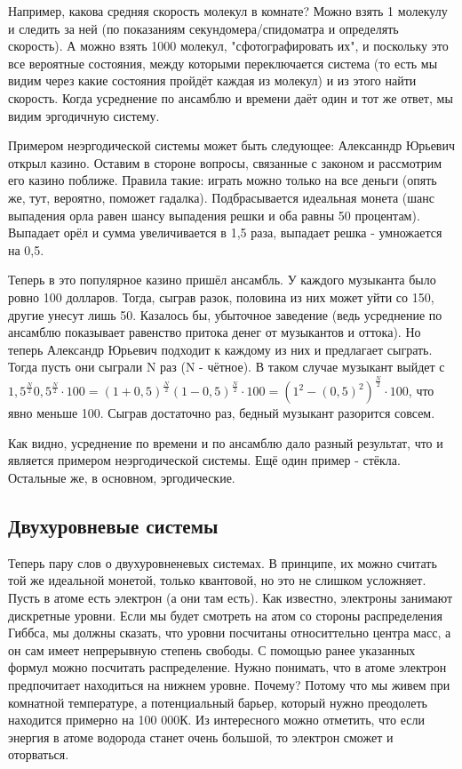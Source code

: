 \documentclass[a4paper, 12pt]{article}
\begin{document}
	Например, какова средняя скорость молекул в комнате? Можно взять 1 молекулу и следить за ней (по показаниям секундомера/спидоматра и определять скорость). А можно взять 1000 молекул, "сфотографировать их", и поскольку это все вероятные состояния, между которыми переключается система (то есть мы видим через какие состояния пройдёт каждая из молекул) и из этого найти скорость. Когда усреднение по ансамблю и времени даёт один и тот же ответ, мы видим эргодичную систему. 
	
	Примером неэргодической системы может быть следующее:
	Алексанндр Юрьевич открыл казино. Оставим в стороне вопросы, связанные с законом и рассмотрим его казино поближе. Правила такие: играть можно только на все деньги (опять же, тут, вероятно, поможет гадалка). Подбрасывается идеальная монета (шанс выпадения орла равен шансу выпадения решки и оба равны 50 процентам). Выпадает орёл и сумма увеличивается в 1,5 раза, выпадает решка - умножается на 0,5.
	
	Теперь в это популярное казино пришёл ансамбль. У каждого музыканта было ровно 100 долларов. Тогда, сыграв разок, половина из них может уйти со 150, другие унесут лишь 50. Казалось бы, убыточное заведение (ведь усреднение по ансамблю показывает равенство притока денег от музыкантов и оттока). Но теперь Александр Юрьевич подходит к каждому из них и предлагает сыграть. Тогда пусть они сыграли N раз (N - чётное). В таком случае музыкант выйдет с $1,5^{\frac{N}{2}} 0,5^{\frac{N}{2}} \cdot 100 = (1+0,5)^{\frac{N}{2}} (1-0,5)^{\frac{N}{2}} \cdot 100= (1^{2}-(0,5)^{2})^{\frac{N}{2}} \cdot 100$, что явно меньше 100. Сыграв достаточно раз, бедный музыкант разорится совсем. 
	
	Как видно, усреднение по времени и по ансамблю дало разный результат, что и является примером неэргодической системы. Ещё один пример - стёкла. Остальные же, в основном, эргодические. 
	\subsection{Двухуровневые системы}
	Теперь пару слов о двухуровненевых системах. В принципе, их можно считать той же идеальной монетой, только квантовой, но это не слишком усложняет. Пусть в атоме есть электрон (а они там есть). Как известно, электроны занимают дискретные уровни. Если мы будет смотреть на атом со стороны распределения Гиббса, мы должны сказать, что уровни посчитаны относиттельно центра масс, а он сам имеет непрерывную степень свободы. С помощью ранее указанных формул можно посчитать распределение. Нужно понимать, что в атоме электрон предпочитает находиться на нижнем уровне. Почему? Потому что мы живем при комнатной температуре, а потенциальный барьер, который нужно преодолеть находится примерно на 100 000К. Из интересного можно отметить, что если энергия в атоме водорода станет очень большой, то электрон сможет и оторваться. 
	
\end{document}

